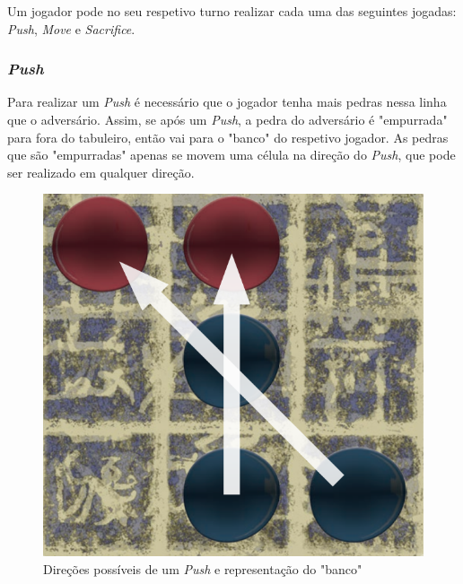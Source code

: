 \documentclass[a4paper]{article}
\begin{document}
Um jogador pode no seu respetivo turno realizar cada uma das seguintes jogadas: \textit{Push}, \textit{Move} e \textit{Sacrifice}.

\subsubsection{\textit{Push}}

Para realizar um  \textit{Push} é necessário que o jogador tenha mais pedras nessa linha que o adversário. Assim, se após um  \textit{Push}, a pedra do adversário é "empurrada" para fora do tabuleiro, então vai para o "banco" do respetivo jogador. As pedras que são "empurradas" apenas se movem uma célula na direção do \textit{Push}, que pode ser realizado em qualquer direção.

\begin{figure}[!htb]
\centering
\includegraphics[scale=0.3]{push.png} 
\caption{Direções possíveis de um \textit{Push} e representação do "banco"}
\end{figure}
\end{document}
